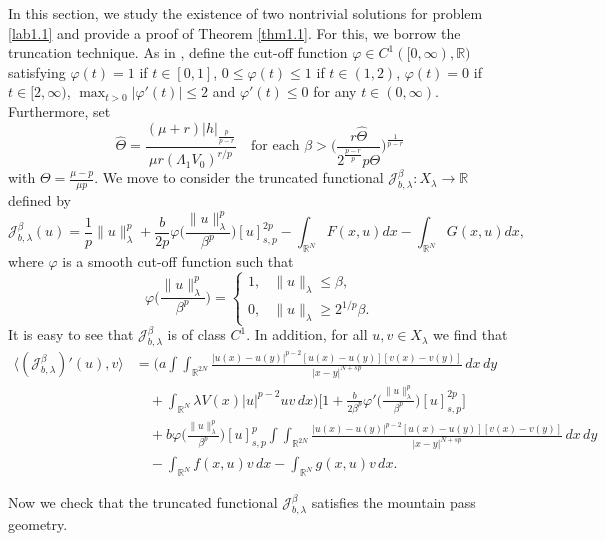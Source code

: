 \documentclass[reqno]{amsart}
\begin{document}
In this section, we study the existence of two nontrivial solutions for problem 
\eqref{lab1.1} and provide a proof of Theorem \ref{thm1.1}. For this, we borrow the 
truncation technique. As in \cite{r16}, define the cut-off function 
$\varphi \in C^1([0,\infty),  \mathbb{R})$  satisfying $\varphi(t)=1$ if $t\in[0,1]$, 
$0\leq\varphi(t)\leq1$ if $t\in(1,2)$, $\varphi(t)=0$ if $t\in[2,\infty)$, 
$\max_{t>0}|\varphi'(t)|\leq2$ and $\varphi'(t)\leq0$ for any $t\in(0,\infty)$.
 Furthermore, set
\[
\widehat{\Theta}=\frac{(\mu+r)|h|_{\frac{p}{p-r}}}{\mu r (\Lambda_1 V_0)^{r/p}}
\quad\text{for each }
\beta>\Big(\frac{r\widehat{\Theta}}{2^{\frac{p-r}{p}} p\Theta }\Big)^{\frac{1}{p-r}}
\]
with $\Theta=\frac{\mu-p}{\mu p}$. We move to consider the truncated functional 
$\mathcal{J}^\beta_{b,\lambda}: X_\lambda\to  \mathbb{R}$ defined by
$$
 \mathcal{J}^\beta_{b,\lambda}(u)=\frac{1}{p}\|u\|^p_\lambda+\frac{b}{2p}\varphi\Big( \frac{\|u\|^p_\lambda}{\beta^p}
\Big)[u]^{2p}_{s,p}-\int_{\mathbb{R}^N}F(x,u)dx-\int_{\mathbb{R}^N}G(x,u)dx,
$$
where $\varphi$ is a smooth cut-off function such that
\[
\varphi\Big( \frac{\|u\|^p_\lambda}{\beta^p} \Big)=
\begin{cases}
1, & \|u\|_\lambda \leq \beta, \\
0,& \|u\|_\lambda \geq 2^{1/p}\beta.
\end{cases}
\]
It is easy to see that $\mathcal{J}^\beta_{b,\lambda}$ is of class $C^1$. 
In addition, for all $u, v\in X_\lambda$ we find that
\begin{align*}
\langle (\mathcal{J}^\beta_{b,\lambda})'(u),v\rangle
&= \Big(a\int\int_{\mathbb{R}^{2N}}\frac{|u(x)-u(y)|^{p-2}[u(x)-u(y)]
 [v(x)-v(y)]}{|x-y|^{N+sp}}\,dx\,dy  \\
&\quad +\int_{\mathbb{R}^N}\lambda V(x)|u|^{p-2}uv\,dx\Big) 
\Big[1+\frac{b}{2\beta^p}\varphi'\Big( \frac{\|u\|^p_\lambda}{\beta^p} 
 \Big)[u]_{s,p}^{2p}\Big]  \\
&\quad +b \varphi\Big( \frac{\|u\|^p_\lambda}{\beta^p} \Big)
 [u]_{s,p}^p\int\int_{\mathbb{R}^{2N}}\frac{|u(x)-u(y)|^{p-2}[u(x)-u(y)][v(x)
 -v(y)]}{|x-y|^{N+sp}}\,dx\,dy  \\
&\quad -\int_{\mathbb{R}^N}f(x,u)v\,dx-\int_{\mathbb{R}^N}g(x,u)v\,dx.
\end{align*}

Now we check that the truncated functional $\mathcal{J}^\beta_{b,\lambda}$ 
satisfies the mountain pass geometry.
\end{document}
